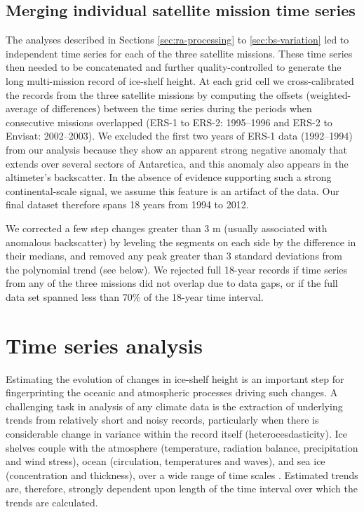 \subsection{Merging individual satellite mission time series}

The analyses described in Sections \ref{sec:ra-processing} to \ref{sec:bs-variation} led to independent time series for each of the three satellite missions. These time series then needed to be concatenated and further quality-controlled to generate the long multi-mission record of ice-shelf height. At each grid cell we cross-calibrated the records from the three satellite missions by computing the offsets (weighted-average of differences) between the time series during the periods when consecutive missions overlapped (ERS-1 to ERS-2: 1995--1996 and ERS-2 to Envisat: 2002--2003). We excluded the first two years of ERS-1 data (1992--1994) from our analysis because they show an apparent strong negative anomaly that extends over several sectors of Antarctica, and this anomaly also appears in the altimeter's backscatter. In the absence of evidence supporting such a strong continental-scale signal, we assume this feature is an artifact of the data. Our final dataset therefore spans 18 years from 1994 to 2012.

We corrected a few step changes greater than 3 m (usually associated with anomalous backscatter) by leveling the segments on each side by the difference in their medians, and removed any peak greater than 3 standard deviations from the polynomial trend (see below). We rejected full 18-year records if time series from any of the three missions did not overlap due to data gaps, or if the full data set spanned less than 70\% of the 18-year time interval.

\section{Time series analysis}

Estimating the evolution of changes in ice-shelf height is an important step for fingerprinting the oceanic and atmospheric processes driving such changes. A challenging task in analysis of any climate data is the extraction of underlying trends from relatively short and noisy records, particularly when there is considerable change in variance within the record itself (heterocesdasticity). Ice shelves couple with the atmosphere (temperature, radiation balance, precipitation and wind stress), ocean (circulation, temperatures and waves), and sea ice (concentration and thickness), over a wide range of time scales \parencite{Paolo2015}. Estimated trends are, therefore, strongly dependent upon length of the time interval over which the trends are calculated.

